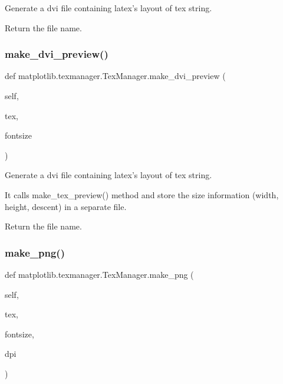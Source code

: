 \begin{DoxyVerb}Generate a dvi file containing latex's layout of tex string.

Return the file name.
\end{DoxyVerb}
 \mbox{\label{classmatplotlib_1_1texmanager_1_1TexManager_af09778e7d60c71661eb0d351ce13ada2}} 
\subsubsection{\texorpdfstring{make\+\_\+dvi\+\_\+preview()}{make\_dvi\_preview()}}
{\footnotesize\ttfamily def matplotlib.\+texmanager.\+Tex\+Manager.\+make\+\_\+dvi\+\_\+preview (\begin{DoxyParamCaption}\item[{}]{self,  }\item[{}]{tex,  }\item[{}]{fontsize }\end{DoxyParamCaption})}

\begin{DoxyVerb}Generate a dvi file containing latex's layout of tex string.

It calls make_tex_preview() method and store the size information
(width, height, descent) in a separate file.

Return the file name.
\end{DoxyVerb}
 \mbox{\label{classmatplotlib_1_1texmanager_1_1TexManager_a6c81a8c74ea6a3fc9727d91cae1cba99}} 
\subsubsection{\texorpdfstring{make\+\_\+png()}{make\_png()}}
{\footnotesize\ttfamily def matplotlib.\+texmanager.\+Tex\+Manager.\+make\+\_\+png (\begin{DoxyParamCaption}\item[{}]{self,  }\item[{}]{tex,  }\item[{}]{fontsize,  }\item[{}]{dpi }\end{DoxyParamCaption})}

